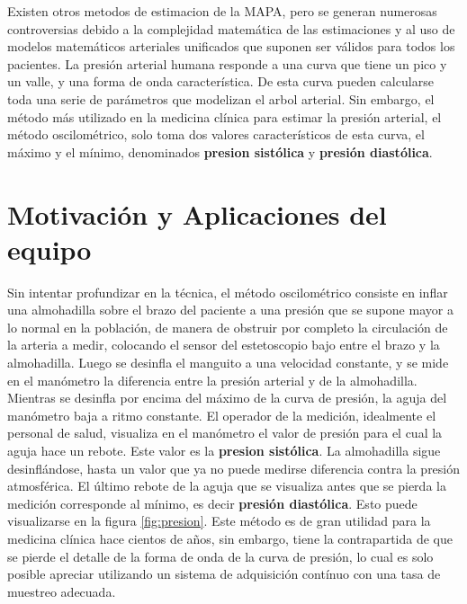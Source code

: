 Existen otros metodos de estimacion de la MAPA, pero se generan numerosas controversias debido a la complejidad matemática de las estimaciones y al uso de modelos matemáticos  arteriales unificados que suponen ser válidos para todos los pacientes. 
La presión arterial humana responde a una curva que tiene un pico y un valle, y una forma de onda característica. De esta curva pueden calcularse toda una serie de parámetros que modelizan el arbol arterial. Sin embargo, el método más utilizado en la medicina clínica para estimar la presión arterial, el método oscilométrico, solo toma dos valores característicos de esta curva, el máximo y el mínimo, denominados \textbf{presion sistólica} y \textbf{presión diastólica}. 






\section{Motivación y Aplicaciones del equipo}



Sin intentar profundizar en la técnica, el método oscilométrico consiste en inflar una almohadilla sobre el brazo del paciente a una presión que se supone mayor a lo normal en la población, de manera de obstruir por completo la circulación de la arteria a medir, colocando el sensor del estetoscopio bajo entre el brazo y la almohadilla. Luego se desinfla el manguito a una velocidad constante, y se mide en el manómetro la diferencia entre la presión arterial y de la almohadilla. Mientras se desinfla por encima del máximo de la curva de presión, la aguja del manómetro baja a ritmo constante. El operador de la medición, idealmente el personal de salud, visualiza en el manómetro el valor de presión para el cual la aguja hace un rebote. Este valor es la \textbf{presion sistólica}. La almohadilla sigue desinflándose, hasta un valor que ya no puede medirse diferencia contra la presión atmosférica. El último rebote de la aguja que se visualiza antes que se pierda la medición corresponde al mínimo, es decir \textbf{presión diastólica}. Esto puede visualizarse en la figura \ref{fig:presion}. Este método es de gran utilidad para la medicina clínica hace cientos de años, sin embargo, tiene la contrapartida de que se pierde el detalle de la forma de onda de la curva de presión, lo cual es solo posible apreciar utilizando un sistema de adquisición contínuo con una tasa de muestreo adecuada.


